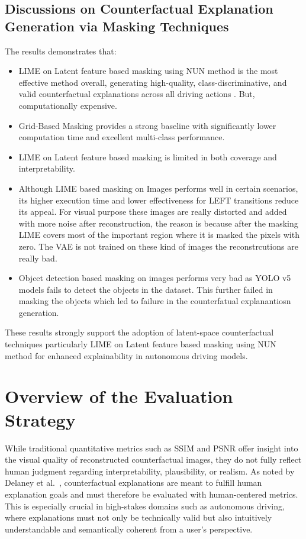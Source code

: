 \subsection{Discussions on Counterfactual Explanation Generation via
Masking Techniques}
The results demonstrates that:
\begin{itemize}
    \item LIME on Latent feature based masking using NUN method is the most effective method overall, generating high-quality, class-discriminative, and valid counterfactual explanations across all driving actions . But, computationally expensive.
    \item Grid-Based Masking provides a strong baseline with significantly lower computation time and excellent multi-class performance.
    \item LIME on Latent feature based masking is limited in both coverage and interpretability.
    \item Although LIME based masking on Images performs well in certain scenarios, its higher execution time and lower effectiveness for LEFT transitions reduce its appeal. For visual purpose these images are really distorted and added with more noise after reconstruction, the reason is because after the masking LIME covers most of the important region where it is masked the pixels with zero. The VAE is not trained on these kind of images the reconstrcutions are really bad.
    \item Objcet detection based masking on images performs very bad as YOLO v5 models fails to detect the objects in the dataset. This further failed in masking the objects which led to failure in the counterfatual explanantiosn generation. 
\end{itemize}
These results strongly support the adoption of latent-space counterfactual techniques particularly LIME on Latent feature based masking using NUN method for enhanced explainability in autonomous driving models.












\section{Overview of the Evaluation Strategy} \label{sec:human_evluation}

While traditional quantitative metrics such as SSIM and PSNR offer insight into the visual quality of reconstructed counterfactual images, they do not fully reflect human judgment regarding interpretability, plausibility, or realism. As noted by Delaney et al.~\cite{DELANEY2023103995}, counterfactual explanations are meant to fulfill human explanation goals and must therefore be evaluated with human-centered metrics. This is especially crucial in high-stakes domains such as autonomous driving, where explanations must not only be technically valid but also intuitively understandable and semantically coherent from a user's perspective.

